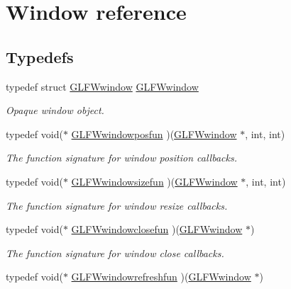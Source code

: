 \hypertarget{group__window}{
\section{Window reference}
\label{group__window}
}
\subsection*{Typedefs}
\begin{CompactItemize}
\item 
typedef struct \hyperlink{group__window_g3c96d80d363e67d13a41b5d1821f3242}{GLFWwindow} \hyperlink{group__window_g3c96d80d363e67d13a41b5d1821f3242}{GLFWwindow}
\begin{CompactList}\small\item\em Opaque window object. \item\end{CompactList}\item 
typedef void($\ast$ \hyperlink{group__window_g1c36e52549efd47790eb3f324da71924}{GLFWwindowposfun} )(\hyperlink{group__window_g3c96d80d363e67d13a41b5d1821f3242}{GLFWwindow} $\ast$, int, int)
\begin{CompactList}\small\item\em The function signature for window position callbacks. \item\end{CompactList}\item 
typedef void($\ast$ \hyperlink{group__window_gaca1c2715759d03da9834eac19323d4a}{GLFWwindowsizefun} )(\hyperlink{group__window_g3c96d80d363e67d13a41b5d1821f3242}{GLFWwindow} $\ast$, int, int)
\begin{CompactList}\small\item\em The function signature for window resize callbacks. \item\end{CompactList}\item 
typedef void($\ast$ \hyperlink{group__window_g07cff8bd3b3d573ecf49bb02d7669c1f}{GLFWwindowclosefun} )(\hyperlink{group__window_g3c96d80d363e67d13a41b5d1821f3242}{GLFWwindow} $\ast$)
\begin{CompactList}\small\item\em The function signature for window close callbacks. \item\end{CompactList}\item 
typedef void($\ast$ \hyperlink{group__window_g16764f89bf2060e6fa477f0943e1412b}{GLFWwindowrefreshfun} )(\hyperlink{group__window_g3c96d80d363e67d13a41b5d1821f3242}{GLFWwindow} $\ast$)

\end{CompactItemize}
